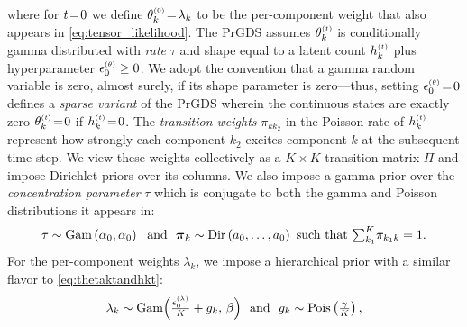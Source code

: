 \documentclass{article}
\begin{document}
where for $t\!=\! 0$ we define $\theta^{\mathsmaller{(0)}}_k \teq \lambda_k$ to be the per-component weight that also appears in \cref{eq:tensor_likelihood}. The PrGDS assumes $\thetakt$ is conditionally gamma distributed with \emph{rate} $\tau$ and shape equal to a latent count $\hkt$ plus hyperparameter $\epstheta \geq 0$. We adopt the convention that a gamma random variable is zero, almost surely, if its shape parameter is zero---thus, setting $\epstheta \teq 0$ defines a \emph{sparse variant} of the PrGDS wherein the continuous states are exactly zero $\thetakt \teq 0$ if $\hkt \teq 0$. The \emph{transition weights} $\pi_{kk_2}$ in the Poisson rate of $\hkt$ represent how strongly each component $k_2$ excites component $k$ at the subsequent time step. We view these weights collectively as a $K \!\times\! K$ transition matrix $\Pi$ and impose Dirichlet priors over its columns. We also impose a gamma prior over the \emph{concentration parameter} $\tau$ which is conjugate to both the gamma and Poisson distributions it appears in:~
\begin{equation}
\tau \sim \Gam{\alpha_0, \alpha_0} \,\,\textrm{ and }\,\,
\boldsymbol{\pi}_k \sim \textrm{Dir}\left(a_0,\dots,a_0\right) \textrm{ such that }\mathsmaller{\sum_{k_1}}^K \pi_{k_1k}=1.
\end{equation}
For the per-component weights $\lambda_k$, we impose a hierarchical prior with a similar flavor to \cref{eq:thetaktandhkt}:~ 
\begin{equation}
\label{eq:lambdakandgk}
\lambda_k \sim \textrm{Gam}\Big(\tfrac{\epslambda}{K} + g_k,\, \beta\Big) \,\,\textrm{ and }\,\,g_k \sim \Pois{\tfrac{\gamma}{K}},
% 
\end{equation}
\end{document}
